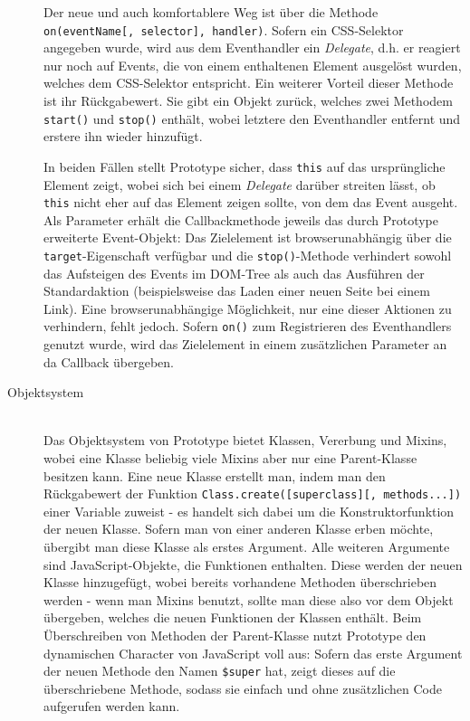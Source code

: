 \begin{description}
Der neue und auch komfortablere Weg ist über die Methode
\lstinline{on(eventName[, selector], handler)}. Sofern ein CSS-Selektor angegeben wurde,
wird aus dem Eventhandler ein \emph{Delegate}, d.h. er reagiert nur noch auf Events, die von einem
enthaltenen Element ausgelöst wurden, welches dem CSS-Selektor entspricht. Ein weiterer Vorteil
dieser Methode ist ihr Rückgabewert. Sie gibt ein Objekt zurück, welches zwei Methodem
\lstinline{start()} und \lstinline{stop()} enthält, wobei letztere den Eventhandler entfernt und
erstere ihn wieder hinzufügt.

In beiden Fällen stellt Prototype sicher, dass \lstinline{this} auf das ursprüngliche Element zeigt,
wobei sich bei einem \emph{Delegate} darüber streiten lässt, ob \lstinline{this} nicht eher auf das
Element zeigen sollte, von dem das Event ausgeht. Als Parameter erhält die Callbackmethode jeweils
das durch Prototype erweiterte Event-Objekt: Das Zielelement ist browserunabhängig über die
\lstinline{target}-Eigenschaft verfügbar und die \lstinline{stop()}-Methode verhindert sowohl das
Aufsteigen des Events im DOM-Tree als auch das Ausführen der Standardaktion (beispielsweise das
Laden einer neuen Seite bei einem Link). Eine browserunabhängige Möglichkeit, nur eine dieser
Aktionen zu verhindern, fehlt jedoch. Sofern \lstinline{on()} zum Registrieren des Eventhandlers
genutzt wurde, wird das Zielelement in einem zusätzlichen Parameter an da Callback übergeben.


\item[Objektsystem] \hfill \\
Das Objektsystem von Prototype bietet Klassen, Vererbung und Mixins, wobei eine Klasse beliebig
viele Mixins aber nur eine Parent-Klasse besitzen kann. Eine neue Klasse erstellt man, indem man den
Rückgabewert der Funktion \lstinline{Class.create([superclass][, methods...])} einer Variable
zuweist - es handelt sich dabei um die Konstruktorfunktion der neuen Klasse. Sofern man von einer
anderen Klasse erben möchte, übergibt man diese Klasse als erstes Argument. Alle weiteren Argumente
sind JavaScript-Objekte, die Funktionen enthalten. Diese werden der neuen Klasse hinzugefügt, wobei
bereits vorhandene Methoden überschrieben werden - wenn man Mixins benutzt, sollte man diese also
vor dem Objekt übergeben, welches die neuen Funktionen der Klassen enthält. Beim Überschreiben von
Methoden der Parent-Klasse nutzt Prototype den dynamischen Character von JavaScript voll aus: Sofern
das erste Argument der neuen Methode den Namen \lstinline{$super} hat, zeigt dieses auf die
überschriebene Methode, sodass sie einfach und ohne zusätzlichen Code aufgerufen werden kann.



\end{description}

